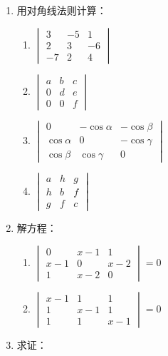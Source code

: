\begin{enumerate}
  \item 用对角线法则计算：
\begin{multicols}{2}
\begin{enumerate}[(1)]
  \item $\begin{vmatrix}
    3&-5&1\\ 2&3&-6\\ -7&2&4 
  \end{vmatrix}$
  \item $\begin{vmatrix}
    a&b&c\\ 0&d&e\\ 0&0&f
  \end{vmatrix}$
  \item $\begin{vmatrix}
    0& -\cos\alpha&-\cos\beta\\
    \cos\alpha & 0& -\cos\gamma\\
    \cos\beta &\cos\gamma &0
  \end{vmatrix}$
  \item $\begin{vmatrix}
    a&h&g\\ h&b&f\\g&f&c
  \end{vmatrix}$
\end{enumerate}
\end{multicols}
  \item 解方程：
\begin{multicols}{2}
\begin{enumerate}[(1)]
  \item $\begin{vmatrix}
    0&x-1&1\\ x-1&0&x-2\\1&x-2&0
  \end{vmatrix}=0$
  \item $\begin{vmatrix}
    x-1&1&1\\ 1&x-1&1\\1&1&x-1
  \end{vmatrix}=0$
\end{enumerate}
\end{multicols}
  \item 求证：
\end{enumerate}
